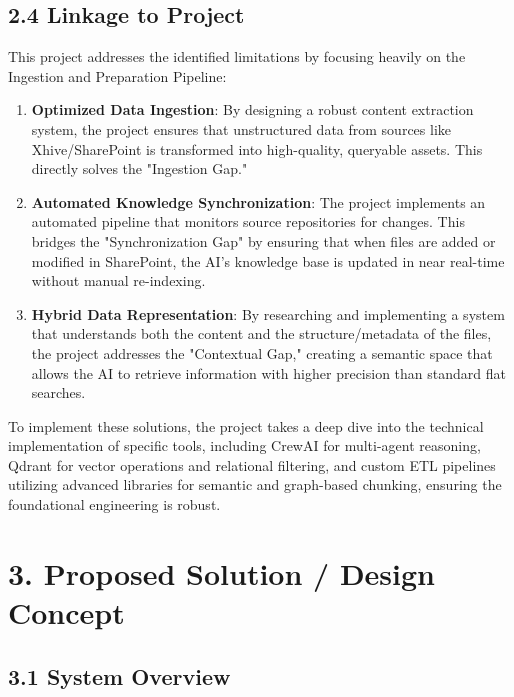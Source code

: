\documentclass[12pt]{article}
\begin{document}
\subsection{2.4 Linkage to Project}\label{linkage-to-project}

This project addresses the identified limitations by focusing heavily on
the Ingestion and Preparation Pipeline:

\begin{enumerate}
\def\labelenumi{\arabic{enumi}.}
\item
  \textbf{Optimized Data Ingestion}: By designing a robust content
  extraction system, the project ensures that unstructured data from
  sources like Xhive/SharePoint is transformed into high-quality,
  queryable assets. This directly solves the "Ingestion Gap."
\item
  \textbf{Automated Knowledge Synchronization}: The project implements
  an automated pipeline that monitors source repositories for changes.
  This bridges the "Synchronization Gap" by ensuring that when files are
  added or modified in SharePoint, the AI's knowledge base is updated in
  near real-time without manual re-indexing.
\item
  \textbf{Hybrid Data Representation}: By researching and implementing a
  system that understands both the content and the structure/metadata of
  the files, the project addresses the "Contextual Gap," creating a
  semantic space that allows the AI to retrieve information with higher
  precision than standard flat searches.
\end{enumerate}

To implement these solutions, the project takes a deep dive into the
technical implementation of specific tools, including CrewAI for
multi-agent reasoning, Qdrant for vector operations and relational
filtering, and custom ETL pipelines utilizing advanced libraries for
semantic and graph-based chunking, ensuring the foundational engineering
is robust.

\section{3. Proposed Solution / Design
Concept}\label{proposed-solution-design-concept}

\subsection{3.1 System Overview}\label{system-overview}
\end{document}
